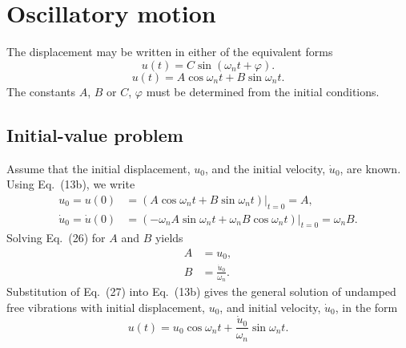 
\section*{Oscillatory motion}


The displacement may be written in either of the equivalent forms
\begin{equation}
    u(t) = C\sin(\omega_n t+\varphi).
    \tag{13a}
\end{equation}
\begin{equation}
    u(t) = A\cos\omega_n t+B\sin\omega_n t.
    \tag{13b}
\end{equation}
The constants $A$, $B$ or $C$, $\varphi$ must be determined from the initial conditions.

\subsection*{Initial-value problem}

Assume that the initial displacement, $u_0$, and the initial velocity, $\dot{u}_0$, are known. Using Eq.~(13b), we write
\begin{equation}
\begin{aligned}
    u_0 = u(0) &= \left.\left(A\cos\omega_n t+B\sin\omega_n t\right)\right|_{t=0}=A,\\
    \dot{u}_0 = \dot{u}(0) &= \left.\left(-\omega_n A\sin\omega_n t+\omega_n B\cos\omega_n t\right)\right|_{t=0}=\omega_n B.
\end{aligned}
    \tag{26}
\end{equation}
Solving Eq.~(26) for $A$ and $B$ yields
\begin{equation}
\begin{aligned}
    A &= u_0,\\
    B &= \frac{\dot{u}_0}{\omega_n}.
\end{aligned}
    \tag{27}
\end{equation}
Substitution of Eq.~(27) into Eq.~(13b) gives the general solution of undamped free vibrations with initial displacement, $u_0$, and initial velocity, $\dot{u}_0$, in the form
\begin{equation}
    u(t)=u_0\cos\omega_n t+\frac{\dot{u}_0}{\omega_n}\sin\omega_n t.
    \tag{28}
\end{equation}
